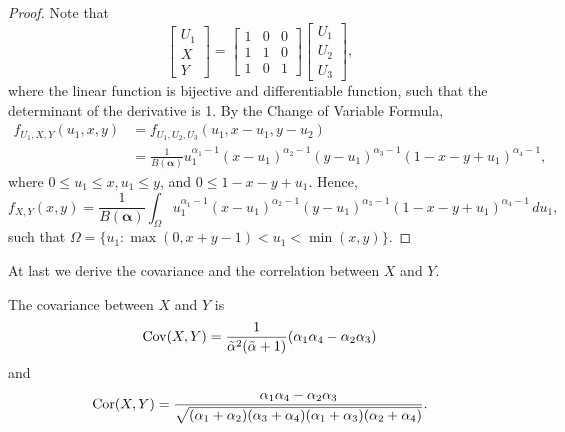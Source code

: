\begin{proof}
  Note that
  $$
  \begin{bmatrix}
    U_1 \\ X \\ Y
  \end{bmatrix}  = \begin{bmatrix}
    1 & 0 & 0 \\
    1 & 1 & 0 \\
    1 & 0 & 1
  \end{bmatrix}\begin{bmatrix}
    U_1 \\ U_2 \\ U_3
  \end{bmatrix}, 
  $$
  where the linear function is bijective and differentiable function, such
  that the determinant of the derivative is 1. By the Change of Variable
  Formula, 
  \begin{equation}
    \begin{split}
      f_{U_1,X,Y}(u_1,x,y) &= f_{U_1,U_2,U_3}(u_1, x - u_1, y - u_2) \\ 
      &= \frac{1}{B(\boldsymbol{\alpha})}u_1^{\alpha_1-1}(x-u_1)^{\alpha_2-1}(y-u_1 )^{\alpha_3-1}(1-x-y+u_1)^{\alpha_4-1},
    \end{split}
  \end{equation}
  where $0 \le u_1 \le x, u_1 \le y$, and $0 \le 1 - x - y + u_1$.  
  Hence,
  \begin{equation}
      \label{eq:dist-X-Y}
      f_{X,Y}(x,y) = \frac{1}{B(\boldsymbol{\alpha})}\int_{\Omega} u_1^{\alpha_1-1}(x-u_1)^{\alpha_2-1}(y-u_1)^{\alpha_3-1}(1-x-y+u_1)^{\alpha_4-1} \, du_1,
  \end{equation}
  such that $\Omega = \{u_1 : \max(0, x + y -1) < u_1 < \min(x,y)\}$.
\end{proof}

At last we derive the covariance and the correlation between $X$ and $Y$.

\begin{proposition}
  \label{prop:covariance-correlation}
  The covariance between $X$ and $Y$ is 
  $$\operatorname{Cov}(X,Y) = \frac{1}{\tilde{\alpha}^2(\tilde{\alpha}+1)}(\alpha_1\alpha_4 - \alpha_2\alpha_3)$$
  and
  $$\operatorname{Cor}(X,Y) = \frac{\alpha_1\alpha_4 - \alpha_2\alpha_3}{\sqrt{(\alpha_1+\alpha_2)(\alpha_3+\alpha_4)(\alpha_1+\alpha_3)(\alpha_2+\alpha_4)}}.$$
\end{proposition}

